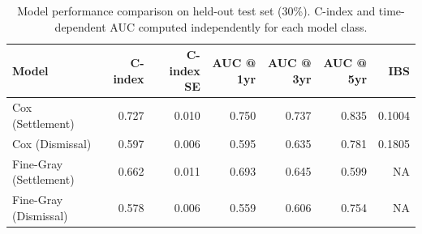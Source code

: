 \begin{table}[!h]
\centering
\caption{\label{tab:model_performance}Model performance comparison on held-out test set (30\%). C-index and time-dependent AUC computed independently for each model class.}
\centering
\begin{tabular}[t]{lrrrrrr}
\toprule
Model & C-index & C-index SE & AUC @ 1yr & AUC @ 3yr & AUC @ 5yr & IBS\\
\midrule
Cox (Settlement) & 0.727 & 0.010 & 0.750 & 0.737 & 0.835 & 0.1004\\
Cox (Dismissal) & 0.597 & 0.006 & 0.595 & 0.635 & 0.781 & 0.1805\\
Fine-Gray (Settlement) & 0.662 & 0.011 & 0.693 & 0.645 & 0.599 & NA\\
Fine-Gray (Dismissal) & 0.578 & 0.006 & 0.559 & 0.606 & 0.754 & NA\\
\bottomrule
\end{tabular}
\end{table}

